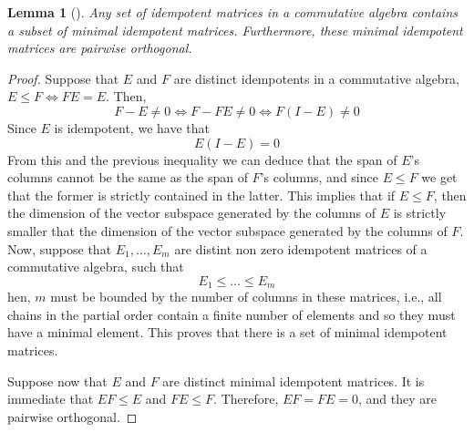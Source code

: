 \documentclass[a4paper,12pt]{article}
\theoremstyle{plain}
\newtheorem{lemma}[theorem]{Lemma}
\theoremstyle{definition}
\theoremstyle{remark}
\begin{document}
\begin{lemma}[{\parencite[Lemma 3.4.3]{godsil_erdoskorado_2015}}]
    Any set of idempotent matrices in a commutative algebra contains a subset of
    minimal idempotent matrices. Furthermore, these minimal idempotent matrices
    are pairwise orthogonal.
    \label{lm:ekr_minimal}
\end{lemma}
\begin{proof}
    Suppose that $ E $ and $ F $ are distinct idempotents in a commutative algebra,
    $ E \leq F \iff FE = E $. Then,
    \[ F-E \neq 0 \iff F - FE \neq 0 \iff F(I-E) \neq 0 \]
    Since $ E $ is idempotent, we have that
    \[ E(I-E) = 0 \]
    From this and the previous inequality we can deduce that the span of $ E $'s
    columns cannot be the same as the span of $ F $'s columns, and since $ E \leq F $
    we get that the former is strictly contained in the latter. This implies that
    if $ E \leq F $, then the dimension of the vector subspace generated by the columns of
    $ E $ is strictly smaller that the dimension of the vector subspace generated
    by the columns of $ F $. Now, suppose that $ E_1, \dots, E_m $ are distint
    non zero idempotent matrices of a commutative algebra, such that
    \[ E_1 \leq \dots \leq E_m \]
    hen, $ m $ must be bounded by the number of columns in these matrices, i.e.,
    all chains in the partial order contain a finite number of elements and
    so they must have a minimal element. This proves that there is a set of
    minimal idempotent matrices.

    Suppose now that $ E $ and $ F $ are distinct minimal idempotent matrices.
    It is immediate that $ EF \leq E $ and $ FE \leq F $. Therefore, $ EF = FE
    = 0 $, and they are pairwise orthogonal.
\end{proof}
\end{document}
